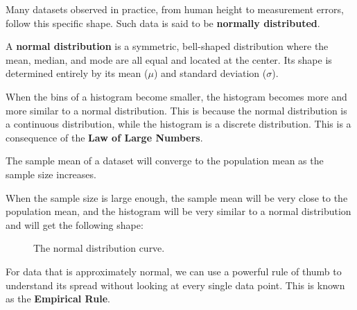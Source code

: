 Many datasets observed in practice, from human height to measurement errors, follow this specific shape. Such data is said to be \textbf{normally distributed}.

\begin{definition}
A \textbf{normal distribution} is a symmetric, bell-shaped distribution where the mean, median, and mode are all equal and located at the center. Its shape is determined entirely by its mean ($\mu$) and standard deviation ($\sigma$).
\end{definition}

When the bins of a histogram become smaller, the histogram becomes more and more similar to a normal distribution. This is because the normal distribution is a continuous distribution, while the histogram is a discrete distribution. This is a consequence of the \textbf{Law of Large Numbers}.

\begin{theorem}
    The sample mean of a dataset will converge to the population mean as the sample size increases.
\end{theorem}

When the sample size is large enough, the sample mean will be very close to the population mean, and the histogram will be very similar to a normal distribution and will get the following shape:

\begin{figure}[htbp]
    \centering
    \caption{The normal distribution curve.}
    \label{fig:normal_curve_smooth}
\end{figure}

For data that is approximately normal, we can use a powerful rule of thumb to understand its spread without looking at every single data point. This is known as the \textbf{Empirical Rule}.

